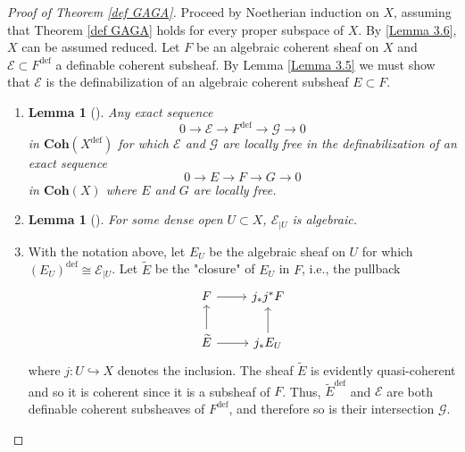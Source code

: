 \documentclass{amsart}
\newtheorem{lemma}[theorem]{Lemma}
\theoremstyle{definition}
\numberwithin{equation}{section}
\newcommand{\definable}{\mathrm{def}}
\begin{document}
\begin{proof}[Proof of Theorem \ref{def GAGA}]
    Proceed by Noetherian induction on $X$,
    assuming that Theorem \ref{def GAGA} holds for every proper subspace of $X$.
    By \ref{Lemma 3.6}, $X$ can be assumed reduced.
    Let $F$ be an algebraic coherent sheaf on $X$ and $\mathcal{E} \subset F^{\definable}$ a definable coherent subsheaf.
    By Lemma \ref{Lemma 3.5} we must show that $\mathcal{E}$ is the definabilization of an algebraic coherent subsheaf $E \subset F$.

    \begin{enumerate}[label = {Step \arabic*.}]
        \item 
        \begin{lemma}[{\cite[Lemma 3.7]{zbMATH07662555}}]
            Any exact sequence 
            \[
            0 \to \mathcal{E} \to F^{\definable} \to \mathcal{G} \to 0
            \]
            in $\mathbf{Coh}(X^{\definable})$ for which $\mathcal{E}$ and $\mathcal{G}$ are locally free in the definabilization of an exact sequence
            \[
            0 \to E \to F \to G \to 0
            \]
            in $\mathbf{Coh}(X)$ where $E$ and $G$ are locally free.
        \end{lemma}

        \item 
        \begin{lemma}[{\cite[Lemma 3.8]{zbMATH07662555}}]
            For some dense open $U \subset X$, $\mathcal{E}_{|U}$ is algebraic.
        \end{lemma}

        \item 
        With the notation above, 
        let $E_U$ be the algebraic sheaf on $U$ for which $(E_U)^{\definable} \cong \mathcal{E}_{|U}$.
        Let $\widetilde{E}$ be the "closure" of $E_U$ in $F$, i.e.,
        the pullback 
        \[\begin{tikzcd}
            F \ar[r] & j_*j^*F \\
            \widetilde{E} \ar[u]\ar[r] & j_*E_U \ar[u]
        \end{tikzcd}\]
        where $j: U \hookrightarrow X$ denotes the inclusion.
        The sheaf $\widetilde{E}$ is evidently quasi-coherent and so it is coherent since it is a subsheaf of $F$.
        Thus, $\widetilde{E}^{\definable}$ and $\mathcal{E}$ are both definable coherent subsheaves of $F^{\definable}$,
        and therefore so is their intersection $\mathcal{G}$.


\end{enumerate}
\end{proof}
\end{document}
